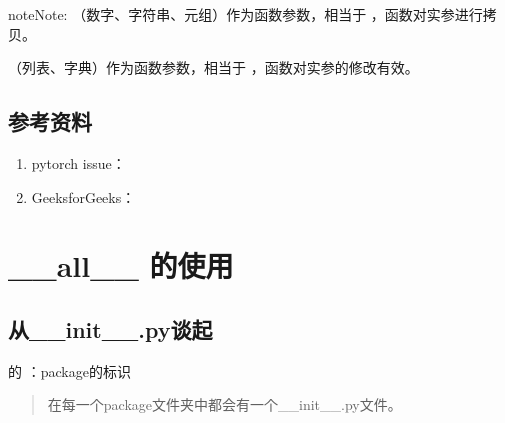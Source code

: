 \documentclass[letterpaper,10pt,english]{sphinxmanual}
\begin{document}
\begin{sphinxadmonition}{note}{Note:}
 （数字、字符串、元组）作为函数参数，相当于  ，函数对实参进行拷贝。

 （列表、字典）作为函数参数，相当于  ，函数对实参的修改有效。
\end{sphinxadmonition}


\subsection{参考资料}
\label{\detokenize{python/01_inplace:id2}}\begin{enumerate}
\item {} 
pytorch issue：

\end{enumerate}
\begin{quote}

\end{quote}
\begin{enumerate}
\setcounter{enumi}{1}
\item {} 
GeeksforGeeks：

\end{enumerate}
\begin{quote}

\end{quote}


\section{\_\_all\_\_ 的使用}
\label{\detokenize{python/02_all:all}}\label{\detokenize{python/02_all::doc}}

\subsection{从\_\_init\_\_.py谈起}
\label{\detokenize{python/02_all:init-py}}
 的  ：package的标识
\begin{quote}

在每一个package文件夹中都会有一个\_\_init\_\_.py文件。
\end{quote}
\end{document}
